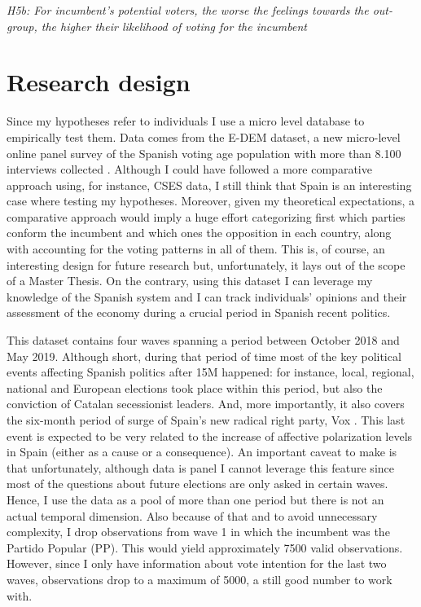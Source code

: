 \documentclass[a4paper, svgnames]{article}
\begin{document}
\textit{H5b: For incumbent's potential voters, the worse the feelings towards the out-group, the higher their likelihood of voting for the incumbent}




\section{Research design}

\label{section:research_design}

Since my hypotheses refer to individuals I use a micro level database to empirically test them. Data comes from the E-DEM dataset, a new micro-level online panel survey of the Spanish voting age population with more than 8.100 interviews collected \citep{Torcal2020}. Although I could have followed a more comparative approach using, for instance, CSES data, I still think that Spain is an interesting case where testing my hypotheses. Moreover, given my theoretical expectations, a comparative approach would imply a huge effort categorizing first which parties conform the incumbent and which ones the opposition in each country, along with accounting for the voting patterns in all of them. This is, of course, an interesting design for future research but, unfortunately, it lays out of the scope of a Master Thesis. On the contrary, using this dataset I can leverage my knowledge of the Spanish system and I can track individuals' opinions and their assessment of the economy during a crucial period in Spanish recent politics.

This dataset contains four waves spanning a period between October 2018 and May 2019. Although short, during that period of time most of the key political events affecting Spanish politics after 15M happened: for instance, local, regional, national and European elections took place within this period, but also the conviction of Catalan secessionist leaders. And, more importantly, it also covers the six-month period of surge of Spain's new radical right party, Vox \citep{Torcal2020}. This last event is expected to be very related to the increase of affective polarization levels in Spain (either as a cause or a consequence). An important caveat to make is that unfortunately, although data is panel I cannot leverage this feature since most of the questions about future elections are only asked in certain waves. Hence, I use the data as a pool of more than one period but there is not an actual temporal dimension. Also because of that and to avoid unnecessary complexity, I drop observations from wave 1 in which the incumbent was the Partido Popular (PP). This would yield approximately 7500 valid observations. However, since I only have information about vote intention for the last two waves, observations drop to a maximum of 5000, a still good number to work with.
\end{document}
